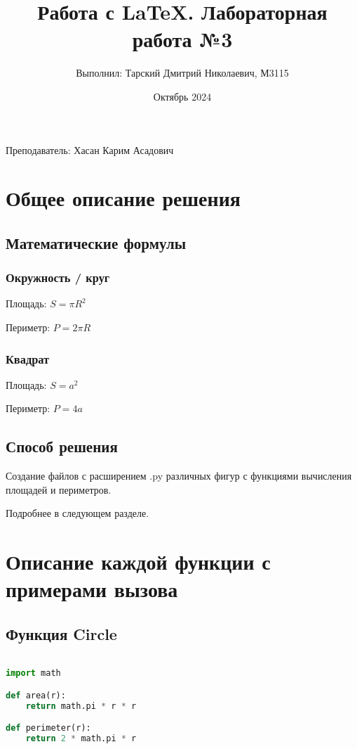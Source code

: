 \documentclass[14pt, a4paper]{article}
\title{Работа с LaTeX. Лабораторная работа №3}
\author{Выполнил: Тарский Дмитрий Николаевич, М3115}
\date{Октябрь 2024}
\begin{document}
\maketitle
\begin{center}
Преподаватель: Хасан Карим Асадович
\end{center}

\newpage

\tableofcontents

\section{Общее описание решения}

\subsection{Математические формулы}

\subsubsection*{\textbf{Окружность / круг}}

Площадь: $S = {\pi}R^2$

Периметр: $P = 2{\pi}R$

\subsubsection*{\textbf{Квадрат}}

Площадь: $S = a^2$

Периметр: $P = 4a$

\subsection{Способ решения}

Создание файлов с расширением .py различных фигур с функциями вычисления площадей и периметров.

Подробнее в следующем разделе.

\section{Описание каждой функции с примерами вызова}

\subsection{Функция Circle}

\begin{lstlisting}[language=Python]

import math

def area(r):
    return math.pi * r * r

def perimeter(r):
    return 2 * math.pi * r

\end{lstlisting}
\end{document}

